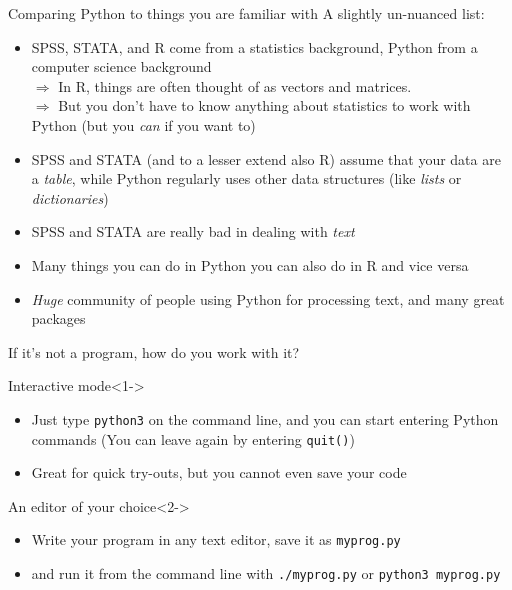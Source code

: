 \documentclass{beamer}
\begin{document}
\begin{frame}{Comparing Python to things you are familiar with}
	{\tiny{A slightly un-nuanced list:}}
	\begin{itemize}
		\item SPSS, STATA, and R come from a statistics background, Python from a computer science background \\
	\footnotesize{$\Rightarrow$ In R, things are often thought of as vectors and matrices.} \\
	\footnotesize{$\Rightarrow$ But you don't have to know anything about statistics to work with Python (but you \emph{can} if you want to)}
	   \item SPSS and STATA (and to a lesser extend also R) assume that your data are a \emph{table}, while Python regularly uses other data structures (like \emph{lists} or \emph{dictionaries})
	\item SPSS and STATA are really bad in dealing with \emph{text}
	\item Many things you can do in Python you can also do in R and vice versa	
	\item \emph{Huge} community of people using Python for processing text, and many great packages
	\end{itemize}
\end{frame}



\begin{frame}{If it's not a program, how do you work with it?}
	\begin{block}{Interactive mode}<1->
		\begin{itemize}
			\item Just type {\tt python3} on the command line, and you can start entering Python commands {\tiny{(You can leave again by entering {\tt quit()})}}
			\item Great for quick try-outs, but you cannot even save your code
		\end{itemize}
	\end{block}
	
	\begin{block}{An editor of your choice}<2->
		\begin{itemize}
			\item Write your program in any text editor, save it as {\tt myprog.py}
			\item and run it from the command line with {\tt ./myprog.py} or {\tt python3 myprog.py}
		\end{itemize}
	\end{block}
\end{frame}
\end{document}
